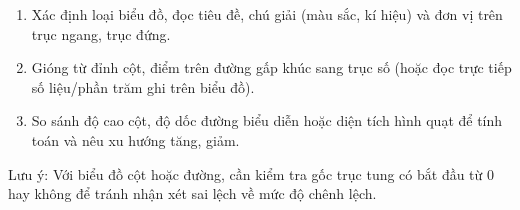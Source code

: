 \begin{enumerate}
\item Xác định loại biểu đồ, đọc tiêu đề, chú giải (màu sắc, kí hiệu) và đơn vị trên trục ngang, trục đứng.
\item Gióng từ đỉnh cột, điểm trên đường gấp khúc sang trục số (hoặc đọc trực tiếp số liệu/phần trăm ghi trên biểu đồ).
\item So sánh độ cao cột, độ dốc đường biểu diễn hoặc diện tích hình quạt để tính toán và nêu xu hướng tăng, giảm.
\end{enumerate}
Lưu ý: Với biểu đồ cột hoặc đường, cần kiểm tra gốc trục tung có bắt đầu từ $0$ hay không để tránh nhận xét sai lệch về mức độ chênh lệch.
